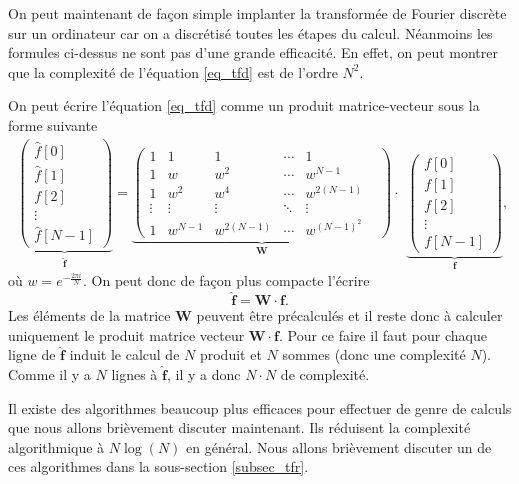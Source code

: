 \documentclass[a4paper,12pt]{book}
\newcommand{\fh}{\hat{f}}
\renewcommand{\eqref}[1]{\ref{#1}}
\begin{document}
On peut maintenant de façon simple implanter la transformée de Fourier discrète sur un
ordinateur car on a discrétisé toutes les étapes du calcul. Néanmoins les formules ci-dessus 
ne sont pas d'une grande efficacité. En effet, on peut montrer que la complexité de
l'équation \eqref{eq_tfd} est de l'ordre $N^2$. 

On peut écrire l'équation \eqref{eq_tfd} comme un produit matrice-vecteur sous la forme suivante
$$
\begin{array}{l} \underbrace{\begin{pmatrix} \fh[0] \\ \fh[1] \\ f[2] \\ \vdots \\ \fh[N-1] \end{pmatrix}}_{\hat{\bm{f}}} = \underbrace{\begin{pmatrix} 1 & 1 & 1 & \cdots & 1\\ 1 & w & w^2 & \cdots & w^{N-1}\\ 1 & w^2 & w^4 & \cdots & w^{2(N-1)}\\ \vdots & \vdots & \vdots & \ddots & \vdots &\\ 1 & w^{N-1} & w^{2(N-1)} & \cdots & w^{(N-1)^2} \end{pmatrix}}_{\bm{W}}\cdot \end{array} \underbrace{\begin{pmatrix} f[0] \\ f[1] \\ f[2] \\ \vdots \\ f[N-1] \end{pmatrix}}_{\bm{f}},
$$
où $w = e^{-\frac{2 \pi i}{N}}$. On peut donc de façon plus compacte l'écrire 
\begin{equation}
 \hat{\bm{f}}=\bm{W}\cdot \bm{f}.
\end{equation}
Les éléments de la matrice $\bm{W}$ peuvent être précalculés et il reste donc à calculer
uniquement le produit matrice vecteur $\bm{W}\cdot\bm{f}$. Pour ce faire il faut pour chaque
ligne de $\hat{\bm{f}}$ induit le calcul de $N$ produit et $N$ sommes (donc une complexité
$N$). Comme il y a $N$ lignes à $\hat{\bm{f}}$, il y a donc $N\cdot N$ de complexité.

Il existe des algorithmes beaucoup plus efficaces pour effectuer de genre de calculs que
nous allons brièvement discuter maintenant. Ils réduisent la complexité algorithmique à 
$N\log(N)$ en général. Nous allons brièvement discuter un de ces algorithmes dans la 
sous-section \ref{subsec_tfr}.
\end{document}
